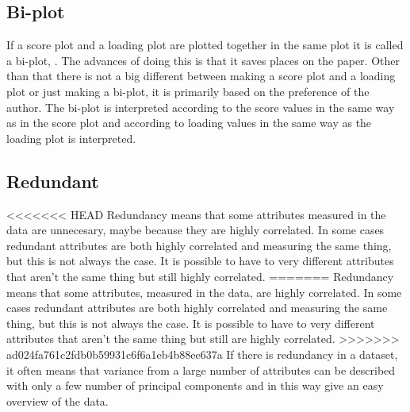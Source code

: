 \subsection*{Bi-plot}
If a score plot and a loading plot are plotted together in the same plot it is called a bi-plot, \parencite[p. 217]{Naes2010}. The advances of doing this is that it saves places on the paper. Other than that there is not a big different between making a score plot and a loading plot or just making a bi-plot, it is primarily based on the preference of the author. The bi-plot is interpreted according to the score values in the same way as in the score plot and according to loading values in the same way as the loading plot is interpreted. 
%
\subsection*{Redundant}
<<<<<<< HEAD
Redundancy means that some attributes measured in the data are unnecesary, maybe because they are highly correlated. 
In some cases redundant attributes are both highly correlated and measuring the same thing, but this is not always the case. It is possible to have to very different attributes that aren't the same thing but still highly correlated. \blankline
=======
Redundancy means that some attributes, measured in the data, are highly correlated. 
In some cases redundant attributes are both highly correlated and measuring the same thing, but this is not always the case. It is possible to have to very different attributes that aren't the same thing but still are highly correlated. \blankline
>>>>>>> ad024fa761c2fdb0b59931c6f6a1eb4b88ee637a
%
If there is redundancy in a dataset, it often means that variance from a large number of attributes can be described with only a few number of principal components and in this way give an easy overview of the data. 